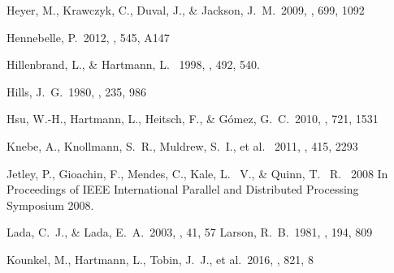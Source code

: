 \begin{thebibliography}



 Heyer, M., Krawczyk, C., 
Duval, J., \& Jackson, J.~M.\ 2009, \apj, 699, 1092 

 Hennebelle, P.\ 2012, \aap, 545, A147 



 Hillenbrand, L., \& Hartmann, L. \ 1998, \apj, 492, 540.

 Hills, J.~G.\ 1980, \apj, 235, 
986

 Hsu, W.-H., Hartmann, L., 
Heitsch, F., \& G{\'o}mez, G.~C.\ 2010, \apj, 721, 1531 








 Knebe, A., Knollmann, S.~R., Muldrew, S.~I., et al. \ 2011, \mnras, 415, 2293


 Jetley, P., Gioachin, F.,  Mendes, C., Kale, L. ~V., \& Quinn, T. ~R. \ 2008  In Proceedings of IEEE International Parallel and Distributed Processing Symposium 2008.


 Lada, C.~J., \& Lada, E.~A.\ 2003, \araa, 41, 57 
 Larson, R.~B.\ 1981, \mnras, 194, 809 

 Kounkel, M., Hartmann, L., Tobin, J.~J., et al.\ 2016, \apj, 821, 8 


\end{thebibliography}
